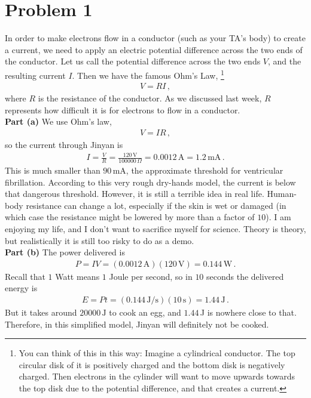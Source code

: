 \documentclass[11pt]{article}
\begin{document}
\section*{Problem 1}
In order to make electrons flow in a conductor (such as your TA's body) to create a current, we need to apply an electric potential difference across the two ends of the conductor. Let us call the potential difference across the two ends $V$, and the resulting current $I$. Then we have the famous Ohm's Law, \footnote{You can think of this in this way: Imagine a cylindrical conductor. The top circular disk of it is positively charged and the bottom disk is negatively charged. Then electrons in the cylinder will want to move upwards towards the top disk due to the potential difference, and that creates a current.}
\begin{align*}
V=RI\,,
\end{align*}
where $R$ is the resistance of the conductor. As we discussed last week, $R$ represents how difficult it is for electrons to flow in a conductor.\\

\noindent\textbf{Part (a)} We use Ohm's law,
\begin{align*}
V = IR\,,
\end{align*}
so the current through Jinyan is
\begin{align*}
I = \frac{V}{R} = \frac{120\,\text{V}}{100000\,\Omega} = 0.0012\,\text{A} = 1.2\,\text{mA}\,.
\end{align*}
This is much smaller than $90$\,mA, the approximate threshold for ventricular fibrillation. According to this very rough dry-hands model, the current is below that dangerous threshold. However, it is still a terrible idea in real life. Human-body resistance can change a lot, especially if the skin is wet or damaged (in which case the resistance might be lowered by more than a factor of $10$). I am enjoying my life, and I don't want to sacrifice myself for science. Theory is theory, but realistically it is still too risky to do as a demo.\\

\noindent\textbf{Part (b)} The power delivered is
\begin{align*}
P = IV = (0.0012\,\text{A})(120\,\text{V}) = 0.144\,\text{W}\,.
\end{align*}
Recall that $1$ Watt means $1$ Joule per second, so in $10$ seconds the delivered energy is
\begin{align*}
E = Pt = (0.144\,\text{J/s})(10\,\text{s}) = 1.44\,\text{J}\,.
\end{align*}
But it takes around
$20000\,\text{J}$
to cook an egg, and $1.44$\,J is nowhere close to that. Therefore, in this simplified model, Jinyan will definitely not be cooked.\\
\end{document}
